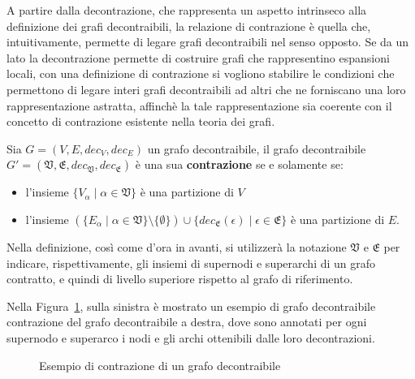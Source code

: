 
\label{subsec:contrazioni}

A partire dalla decontrazione, che rappresenta un aspetto intrinseco alla definizione dei grafi decontraibili,
la relazione di contrazione \`e quella che, intuitivamente, permette di legare grafi decontraibili nel senso
opposto.
Se da un lato la decontrazione permette di costruire grafi che rappresentino espansioni locali, con una
definizione di contrazione si vogliono stabilire le condizioni che permettono di legare interi grafi decontraibili
ad altri che ne forniscano una loro rappresentazione astratta, affinch\`e la tale rappresentazione
sia coerente con il concetto di contrazione esistente nella teoria dei grafi.

\begin{definition}
    Sia $G = (V, E, dec_V, dec_E)$ un grafo decontraibile, il grafo decontraibile \\
    $G\mathcal{'} = (\mathfrak{V}, \mathfrak{E}, dec_{\mathfrak{V}}, dec_{\mathfrak{E}})$ \`e una sua
    \textbf{contrazione} se e solamente se:
        \begin{itemize}
            \item l'insieme $\{V_\alpha \mid \alpha \in \mathfrak{V}\}$ \`e una partizione di $V$
            \item l'insieme $(\{E_\alpha \mid \alpha \in \mathfrak{V}\} \setminus \{ \emptyset \}) \cup
                \{ dec_{\mathfrak{E}}(\epsilon) \mid \epsilon \in \mathfrak{E}\}$ \`e una partizione di $E$.
        \end{itemize}
\end{definition}

Nella definizione, cos\`{i} come d'ora in avanti, si utilizzer\`a la notazione $\mathfrak{V}$ e $\mathfrak{E}$ per
indicare, rispettivamente, gli insiemi di supernodi e superarchi di un grafo contratto, e quindi di livello
superiore rispetto al grafo di riferimento.

Nella Figura~\ref{fig:contraction-example}, sulla sinistra \`e mostrato un esempio di grafo decontraibile
contrazione del grafo decontraibile a destra, dove sono annotati per ogni supernodo e superarco
i nodi e gli archi ottenibili dalle loro decontrazioni. \newline

\begin{figure}
    \centering
    
    \caption{Esempio di contrazione di un grafo decontraibile}
    \label{fig:contraction-example}
\end{figure}

